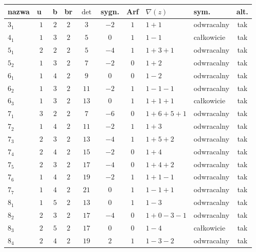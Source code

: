 \renewcommand*{\arraystretch}{1.4}
\footnotesize
\begin{longtable}{lccccccllc}
\hline
nazwa & u~& b & br & $\det$ & sygn. & Arf & $\nabla(z)$ & sym. & alt. \\ \hline
\endhead %
$3_{1}$    & $1$   & $2$ & $2$ & $3$   & $-2$ & $1$ & $1+1$         & odwracalny & tak \\
$4_{1}$    & $1$   & $3$ & $2$ & $5$   & $0$  & $1$ & $1-1$         & całkowicie & tak \\
$5_{1}$    & $2$   & $2$ & $2$ & $5$   & $-4$ & $1$ & $1+3+1$       & odwracalny & tak \\
$5_{2}$    & $1$   & $3$ & $2$ & $7$   & $-2$ & $0$ & $1+2$         & odwracalny & tak \\
$6_{1}$    & $1$   & $4$ & $2$ & $9$   & $0$  & $0$ & $1-2$         & odwracalny & tak \\
$6_{2}$    & $1$   & $3$ & $2$ & $11$  & $-2$ & $1$ & $1-1-1$       & odwracalny & tak \\
$6_{3}$    & $1$   & $3$ & $2$ & $13$  & $0$  & $1$ & $1+1+1$       & całkowicie & tak \\
$7_{1}$    & $3$   & $2$ & $2$ & $7$   & $-6$ & $0$ & $1+6+5+1$     & odwracalny & tak \\
$7_{2}$    & $1$   & $4$ & $2$ & $11$  & $-2$ & $1$ & $1+3$         & odwracalny & tak \\
$7_{3}$    & $2$   & $3$ & $2$ & $13$  & $-4$ & $1$ & $1+5+2$       & odwracalny & tak \\
$7_{4}$    & $2$   & $4$ & $2$ & $15$  & $-2$ & $0$ & $1+4$         & odwracalny & tak \\
$7_{5}$    & $2$   & $3$ & $2$ & $17$  & $-4$ & $0$ & $1+4+2$       & odwracalny & tak \\
$7_{6}$    & $1$   & $4$ & $2$ & $19$  & $-2$ & $1$ & $1+1-1$       & odwracalny & tak \\
$7_{7}$    & $1$   & $4$ & $2$ & $21$  & $0$  & $1$ & $1-1+1$       & odwracalny & tak \\
$8_{1}$    & $1$   & $5$ & $2$ & $13$  & $0$  & $1$ & $1-3$         & odwracalny & tak \\
$8_{2}$    & $2$   & $3$ & $2$ & $17$  & $-4$ & $0$ & $1+0-3-1$     & odwracalny & tak \\
$8_{3}$    & $2$   & $5$ & $2$ & $17$  & $0$  & $0$ & $1-4$         & całkowicie & tak \\
$8_{4}$    & $2$   & $4$ & $2$ & $19$  & $2$  & $1$ & $1-3-2$       & odwracalny & tak \\

\end{longtable}
